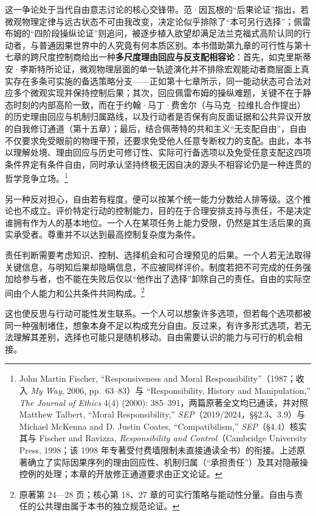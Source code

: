 \documentclass[
  11pt,
  oneside]{book}
\begin{document}
这一争论处于当代自由意志讨论的核心交锋带。范·因瓦根的``后果论证''指出，若微观物理定律与远古状态不可由我改变，决定论似乎排除了``本可另行选择''；佩雷布姆的``四阶段操纵论证''则追问，被逐步植入欲望却满足法兰克福式高阶认同的行动者，与普通因果世界中的人究竟有何本质区别。本书借助第九章的可行性与第十七章的跨尺度控制商给出一种\textbf{多尺度理由回应与反支配相容论}：首先，如克里斯蒂安·李斯特所论证，微观物理层面的单一轨迹演化并不排除宏观能动者商层面上真实存在多条可实施的备选策略分支------正如第十七章所示，同一能动状态可合法对应多个微观实现并保持控制后果；其次，回应佩雷布姆的操纵难题，关键不在于静态时刻的内部高阶一致，而在于约翰·马丁·费舍尔（与马克·拉维扎合作提出）的历史理由回应与机制归属路线，以及行动者是否保有向反面证据和公共异议开放的自我修订通道（第十五章）；最后，结合佩蒂特的共和主义``无支配自由''，自由不仅要求免受眼前的物理干预，还要求免受他人任意专断权力的支配。由此，本书以理解处境、理由回应与历史可修订性、实际可行备选项以及免受任意支配这四项条件界定有条件自由，同时承认坚持终极无因自决的源头不相容论仍是一种连贯的哲学竞争立场。\footnote{\hypertarget{ph-note-54}{}John Martin Fischer, ``Responsiveness and Moral Responsibility''（1987；收入 \emph{My Way}, 2006, pp.~63--83）与 ``Responsibility, History and Manipulation,'' \emph{The Journal of Ethics} 4(4) (2000): 385--391，两篇原著全文均已通读，并对照 Matthew Talbert, ``Moral Responsibility,'' \emph{SEP}（2019/2024，§§2.3、3.9）与 Michael McKenna and D. Justin Coates, ``Compatibilism,'' \emph{SEP}（§4.4）核实其与 Fischer and Ravizza, \emph{Responsibility and Control}（Cambridge University Press, 1998；该 1998 年专著受付费墙限制未直接通读全书）的衔接。上述原著确立了实际因果序列的理由回应性、机制归属（``承担责任''）及其对隐蔽操控例的处理；本章的开放修正通道要求由正文论证。}

另一种反对担心，自由若有程度，便可以按某个统一能力分数给人排等级。这个推论也不成立。评价特定行动的控制能力，目的在于合理安排支持与责任，不是决定谁拥有作为人的基本地位。一个人在某项任务上能力受限，仍然是其生活后果的真实承受者。尊重并不以达到最高控制复杂度为条件。

责任判断需要考虑知识、控制、选择机会和可合理预见的后果。一个人若无法取得关键信息，与明知后果却隐瞒信息，不应被同样评价。制度若把不可完成的任务强加给参与者，也不能在失败后仅以``他作出了选择''卸除自己的责任。自由的实际空间由个人能力和公共条件共同构成。\footnote{\hypertarget{ph-note-55}{}原著第 24---28 页；核心第 18、27 章的可实行策略与能动性分量。自由与责任的公共理由属于本书的独立规范论证。}

这也使反思与行动可能性发生联系。一个人可以想象许多选项，但若每个选项都被同一种强制堵住，想象本身不足以构成充分自由。反过来，有许多形式选项，若无法理解其差别，选择也可能只是随机移动。自由需要认识的能力与可行的机会相接。
\end{document}
